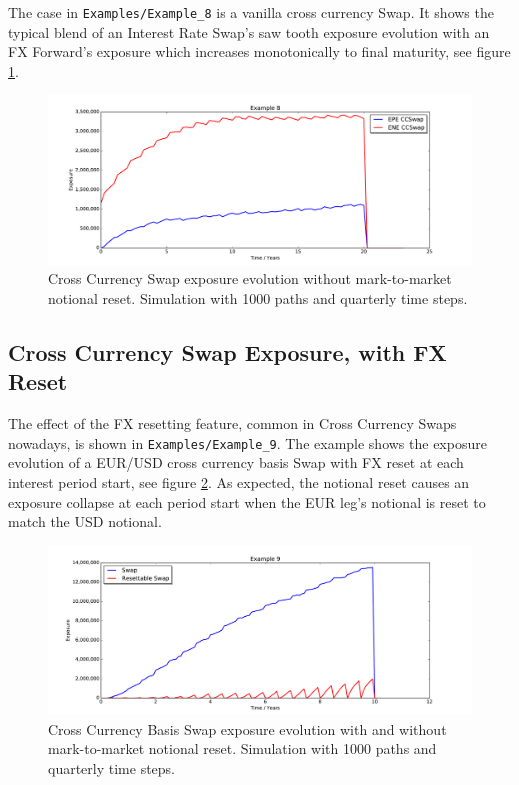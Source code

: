 \documentclass[12pt, a4paper]{article}
\begin{document}
The case in {\tt Examples/Example\_8} is a vanilla cross currency Swap. It shows the typical blend of an Interest Rate
Swap's saw tooth exposure evolution with an FX Forward's exposure which increases monotonically to final maturity, see
figure \ref{fig_6}.
\begin{figure}[h!]
\begin{center}
\includegraphics[scale=0.45]{mpl_ccswap.pdf}
\end{center}
\caption{Cross Currency Swap exposure evolution without mark-to-market notional reset. Simulation with 1000 paths and
  quarterly time steps.}
\label{fig_6}
\end{figure}

\subsection{Cross Currency Swap Exposure, with FX Reset}

The effect of the FX resetting feature, common in Cross Currency Swaps nowadays, is shown in {\tt Examples/Example\_9}.
The example shows the exposure evolution of a EUR/USD cross currency basis Swap with FX reset at each interest period
start, see figure \ref{fig_6b}. As expected, the notional reset causes an exposure collapse at each period start when
the EUR leg's notional is reset to match the USD notional.
\begin{figure}[h!]
\begin{center}
\includegraphics[scale=0.45]{mpl_xccy_reset.pdf}
\end{center}
\caption{Cross Currency Basis Swap exposure evolution with and without mark-to-market notional reset. Simulation with
  1000 paths and quarterly time steps.}
\label{fig_6b}
\end{figure}
  
\end{document}
